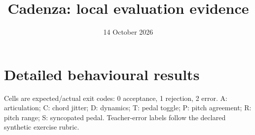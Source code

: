 \documentclass[a4paper,11pt]{article}
\title{Cadenza: local evaluation evidence}
\author{}
\date{14 October 2026}
\begin{document}
\maketitle

\clearpage
\section*{Detailed behavioural results}
Cells are expected/actual exit codes: 0 acceptance, 1 rejection, 2 error.
A: articulation; C: chord jitter; D: dynamics; T: pedal toggle;
P: pitch agreement; R: pitch range; S: syncopated pedal.
Teacher-error labels follow the declared synthetic exercise rubric.
\begin{center}
\resizebox{\textwidth}{!}{}
\end{center}
\end{document}
